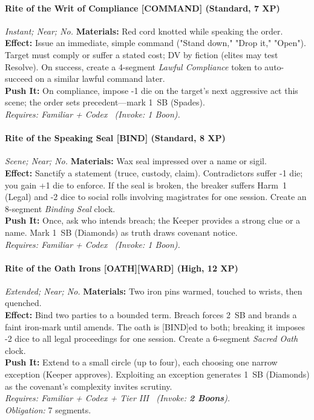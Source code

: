 \paragraph{Rite of the Writ of Compliance \textnormal{[COMMAND]} (Standard, 7 XP)} \emph{Instant; Near; No.}
\textbf{Materials:} Red cord knotted while speaking the order.\\
\textbf{Effect:} Issue an immediate, simple command ("Stand down," "Drop it," "Open"). Target must comply or suffer a stated cost; DV by fiction (elites may test Resolve). On success, create a 4-segment \emph{Lawful Compliance} token to auto-succeed on a similar lawful command later.\\
\textbf{Push It:} On compliance, impose -1 die on the target's next aggressive act this scene; the order sets precedent—mark 1~SB (Spades).\\
\emph{Requires: Familiar + Codex \ (\textit{Invoke:} 1 Boon).}

\paragraph{Rite of the Speaking Seal \textnormal{[BIND]} (Standard, 8 XP)} \emph{Scene; Near; No.}
\textbf{Materials:} Wax seal impressed over a name or sigil.\\
\textbf{Effect:} Sanctify a statement (truce, custody, claim). Contradictors suffer -1 die; you gain +1 die to enforce. If the seal is broken, the breaker suffers Harm~1 (Legal) and -2 dice to social rolls involving magistrates for one session. Create an 8-segment \emph{Binding Seal} clock.\\
\textbf{Push It:} Once, ask who intends breach; the Keeper provides a strong clue or a name. Mark 1~SB (Diamonds) as truth draws covenant notice.\\
\emph{Requires: Familiar + Codex \ (\textit{Invoke:} 1 Boon).}

\paragraph{Rite of the Oath Irons \textnormal{[OATH][WARD]} (High, 12 XP)} \emph{Extended; Near; No.}
\textbf{Materials:} Two iron pins warmed, touched to wrists, then quenched.\\
\textbf{Effect:} Bind two parties to a bounded term. Breach forces 2~SB and brands a faint iron-mark until amends. The oath is [BIND]ed to both; breaking it imposes -2 dice to all legal proceedings for one session. Create a 6-segment \emph{Sacred Oath} clock.\\
\textbf{Push It:} Extend to a small circle (up to four), each choosing one narrow exception (Keeper approves). Exploiting an exception generates 1~SB (Diamonds) as the covenant's complexity invites scrutiny.\\
\emph{Requires: Familiar + Codex + Tier III \ (\textit{Invoke:} \textbf{2 Boons}).}\\
\emph{Obligation:} 7 segments.


